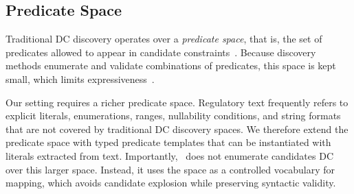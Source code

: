 \subsection{Predicate Space}
\label{sec:mapper:predicate-space}

Traditional DC discovery operates over a \emph{predicate space}, that is, the set of predicates allowed to appear in candidate constraints~\cite{chu2013discovering,Pena2019DiscoveryDC}. Because discovery methods enumerate and validate combinations of predicates, this space is kept small, which limits expressiveness~\cite{chu2013discovering}.

Our setting requires a richer predicate space. Regulatory text frequently refers to explicit literals, enumerations, ranges, nullability conditions, and string formats that are not covered by traditional DC discovery spaces. We therefore extend the predicate space with typed predicate templates that can be instantiated with literals extracted from text. Importantly, \system\ does not enumerate candidates DC  over this larger space. Instead, it uses the space as a controlled vocabulary for mapping, which avoids candidate explosion while preserving syntactic validity.


